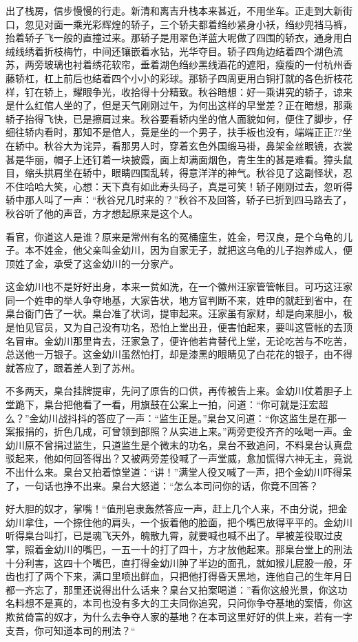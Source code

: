 \documentclass[12pt,UTF8]{ctexbook}
\begin{document}
{{{出了栈房，信步慢慢的行走。新清和离吉升栈本来甚近，不用坐车。正走到大新街口，忽见对面一乘光彩辉煌的轿子，三个轿夫都着绉纱紧身小袄，绉纱兜裆马裤，抬着轿子飞一般的直撞过来。那轿子是用翠色洋蓝大呢做了四围的轿衣，通身用白绒线绣着折枝梅竹，中间还镶嵌着水钻，光华夺目。轿子四角边结着四个湖色流苏，两旁玻璃也衬着绣花软帘，垂着湖色绉纱黑线酒花的遮阳，瘦瘦的一付杭州香藤轿杠，杠上前后也结着四个小小的彩球。那轿子四周更用白铜打就的各色折枝花样，钉在轿上，耀眼争光，收拾得十分精致。秋谷暗想：好一乘讲究的轿子，谅来是什么红倌人坐的了，但是天气刚刚过午，为何出这样的早堂差？正在暗想，那乘轿子抬得飞快，已是擦肩过来。秋谷要看轿内坐的倌人面貌如何，便住了脚步，仔细往轿内看时，那知不是倌人，竟是坐的一个男子，扶手板也没有，端端正正??坐在轿中。秋谷大为诧异，看那男人时，穿着玄色外国缎马褂，鼻架金丝眼镜，衣裳甚是华丽，帽子上还钉着一块披霞，面上却满面烟色，青生生的甚是难看。獐头鼠目，缩头拱肩坐在轿中，眼睛四围乱转，得意洋洋的神气。秋谷见了这副怪状，忍不住哈哈大笑，心想：天下真有如此寿头码子，真是可笑！轿子刚刚过去，忽听得轿中那人叫了一声：“秋谷兄几时来的？”秋谷不及回答，轿子已折到四马路去了，秋谷听了他的声音，方才想起原来是这个人。

看官，你道这人是谁？原来是常州有名的冤桶瘟生，姓金，号汉良，是个乌龟的儿子。本不姓金，他父亲叫金幼川，因为自家无子，就把这乌龟的儿子抱养成人，便顶姓了金，承受了这金幼川的一分家产。

这金幼川也不是好好出身，本来一贫如洗，在一个徽州汪家管管帐目。可巧这汪家同一个姓申的举人争夺地基，大家告状，地方官判断不来，姓申的就赶到省中，在臬台衙门告了一状。臬台准了状词，提审起来。汪家虽有家财，却是向来胆小，极是怕见官员，又为自己没有功名，恐怕上堂出丑，便害怕起来，要叫这管帐的去顶名冒审。金幼川那里肯去，汪家急了，便许他若肯替代上堂，无论吃苦与不吃苦，总送他一万银子。这金幼川虽然怕打，却是漆黑的眼睛见了白花花的银子，由不得就答应了，跟着差人到了苏州。

不多两天，臬台挂牌提审，先问了原告的口供，再传被告上来。金幼川仗着胆子上堂跪下，臬台把他看了一看，用旗鼓在公案上一拍，问道：“你可就是汪宏超么？”金幼川战抖抖的答应了一声：“监生正是。”臬台又问道：“你这监生是在那一案报捐的，折色几成，可曾领到部照？从实进上来。”两旁吏役齐齐的吆喝一声。金幼川原不曾捐过监生，只道监生是个微末的功名，臬台不致追问，不料臬台认真盘驳起来，他如何回答得出？又被两旁差役喊了一声堂威，愈加慌得六神无主，竟说不出什么来。臬台又拍着惊堂道：“讲！”满堂人役又喊了一声，把个金幼川吓得呆了，一句话也挣不出来。臬台大怒道：“怎么本司问你的话，你竟不回答？

好大胆的奴才，掌嘴！“值刑皂隶轰然答应一声，赶上几个人来，不由分说，把金幼川拿住，一个捺住他的肩头，一个扳着他的脸面，把个嘴巴放得平平的。金幼川听得臬台叫打，已是魂飞天外，魄散九霄，就要喊也喊不出了。早被差役取过皮掌，照着金幼川的嘴巴，一五一十的打了四十，方才放他起来。那臬台堂上的刑法十分利害，这四十个嘴巴，直打得金幼川肿了半边的面孔，就如猴儿屁股一般，牙齿也打了两个下来，满口里喷出鲜血，只把他打得昏天黑地，连他自己的生年月日都一齐忘了，那里还说得出什么话来？臬台又拍案喝道：”看你这般光景，你这功名料想不是真的，本司也没有多大的工夫同你追究，只问你争夺基地的案情，你这欺贫倚富的奴才，为什么去争夺人家的基地？在本司这里好好的供上来，若有一字支吾，你可知道本司的刑法？“

}}}
\end{document}
